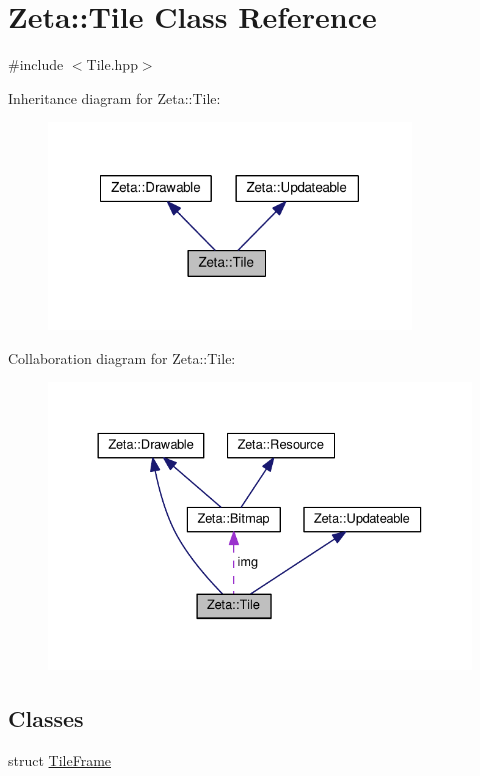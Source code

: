 \hypertarget{classZeta_1_1Tile}{\section{Zeta\+:\+:Tile Class Reference}
\label{classZeta_1_1Tile}
}


{\ttfamily \#include $<$Tile.\+hpp$>$}



Inheritance diagram for Zeta\+:\+:Tile\+:\nopagebreak
\begin{figure}[H]
\begin{center}
\leavevmode
\includegraphics[width=273pt]{classZeta_1_1Tile__inherit__graph}
\end{center}
\end{figure}


Collaboration diagram for Zeta\+:\+:Tile\+:\nopagebreak
\begin{figure}[H]
\begin{center}
\leavevmode
\includegraphics[width=333pt]{classZeta_1_1Tile__coll__graph}
\end{center}
\end{figure}
\subsection*{Classes}
\begin{DoxyCompactItemize}
\item 
struct \hyperlink{structZeta_1_1Tile_1_1TileFrame}{Tile\+Frame}
\end{DoxyCompactItemize}
